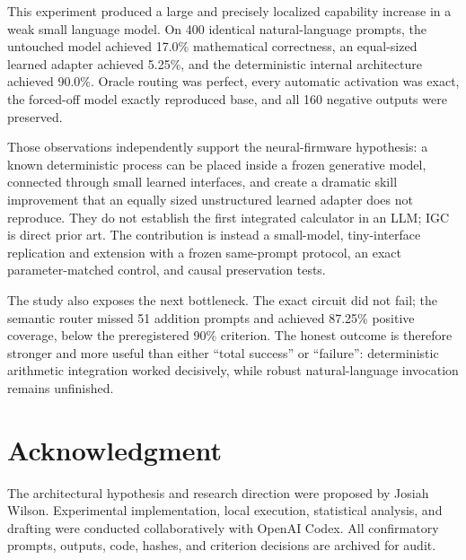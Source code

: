 \documentclass[11pt]{article}
\begin{document}
This experiment produced a large and precisely localized capability increase
in a weak small language model. On 400 identical natural-language prompts,
the untouched model achieved 17.0\% mathematical correctness, an equal-sized
learned adapter achieved 5.25\%, and the deterministic internal architecture
achieved 90.0\%. Oracle routing was perfect, every automatic activation was
exact, the forced-off model exactly reproduced base, and all 160 negative
outputs were preserved.

Those observations independently support the neural-firmware hypothesis: a
known deterministic process can be placed inside a frozen generative model,
connected through small learned interfaces, and create a dramatic skill
improvement that an equally sized unstructured learned adapter does not
reproduce. They do not establish the first integrated calculator in an LLM;
IGC is direct prior art. The contribution is instead a small-model,
tiny-interface replication and extension with a frozen same-prompt protocol,
an exact parameter-matched control, and causal preservation tests.

The study also exposes the next bottleneck. The exact circuit did not fail;
the semantic router missed 51 addition prompts and achieved 87.25\% positive
coverage, below the preregistered 90\% criterion. The honest outcome is
therefore stronger and more useful than either ``total success'' or
``failure'': deterministic arithmetic integration worked decisively, while
robust natural-language invocation remains unfinished.

\section*{Acknowledgment}

The architectural hypothesis and research direction were proposed by Josiah
Wilson. Experimental implementation, local execution, statistical analysis,
and drafting were conducted collaboratively with OpenAI Codex. All
confirmatory prompts, outputs, code, hashes, and criterion decisions are
archived for audit.
\end{document}
